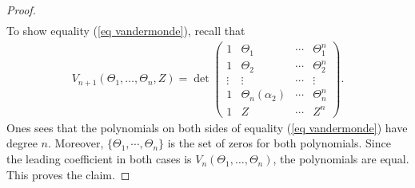 \begin{proof}
\begin{align*}
	\end{align*}
	To show equality (\ref{eq vandermonde}), recall that
	\begin{align*}
		V_{n+1}(\Theta_1,\dots,\Theta_n,Z)=\det\begin{pmatrix}
		1 & \Theta_1 &\cdots& \Theta_1^{n} \\
		1 & \Theta_2 & \cdots& \Theta_2^{n} \\
		\vdots &\vdots &\cdots&\vdots\\
		1 & \Theta_n(\alpha_2) &\cdots& \Theta_n^{n} \\
		1 & Z & \cdots & Z^n
		\end{pmatrix}
		.
	\end{align*}
	Ones sees that the polynomials on both sides of equality (\ref{eq vandermonde}) have degree $n$. Moreover, $\{\Theta_1,\cdots,\Theta_n\}$ is the set of zeros for both polynomials. Since the leading coefficient in both cases is $	V_n(\Theta_1,\dots,\Theta_n)$, the polynomials are equal. This proves the claim. 
\end{proof}


